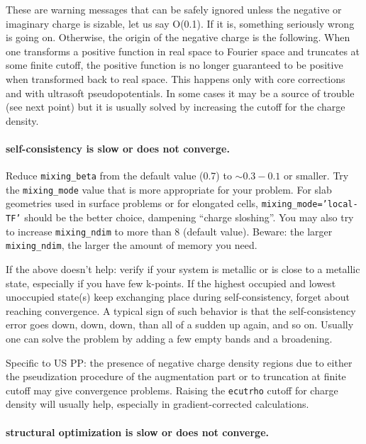 \documentclass[12pt,a4paper]{article}
\begin{document}
These are warning messages that can be safely ignored unless the 
negative or imaginary charge is sizable,
let us say {\cal O(0.1)}. If it is, something seriously 
wrong is going on. Otherwise, the origin of the negative
charge is the following. When one transforms a positive 
function in real space to Fourier space and truncates at 
some finite cutoff, the positive function is no longer 
guaranteed to be positive when transformed back to real 
space. This happens only with core corrections and with 
ultrasoft pseudopotentials. In some cases it may be a 
source of trouble (see next point) but it is usually 
solved by increasing the cutoff for the charge density.

\paragraph{self-consistency is slow or does not converge.}

Reduce \texttt{mixing\_beta} from the default value (0.7) to $\sim
0.3-0.1$ or smaller. Try the \texttt{mixing\_mode} value that is
more appropriate for your problem. For slab geometries used in surface 
problems or for elongated cells, \texttt{mixing\_mode='local-TF'} should
be the better choice, dampening ``charge sloshing''.  You may also try to 
increase \texttt{mixing\_ndim} to more than 8 (default value). Beware: 
the larger \texttt{mixing\_ndim}, the larger the amount of memory you need.

If the above doesn't help: verify if your system is metallic or is
close to a metallic state, especially if you have few k-points.
If the highest occupied and lowest unoccupied state(s) keep exchanging
place during self-consistency, forget about reaching convergence. A 
typical sign of such behavior is that the self-consistency error 
goes down, down, down, than all of a sudden up again, and so on.
Usually one can solve the problem by adding a few empty bands and a
broadening.

Specific to US PP: the presence of negative charge density regions due
to either the pseudization procedure of the augmentation part or to
truncation at finite cutoff may give convergence problems.
Raising the \texttt{ecutrho} cutoff for charge density will usually
help, especially in gradient-corrected calculations.

\paragraph{structural optimization is slow or does not converge.}
\end{document}
